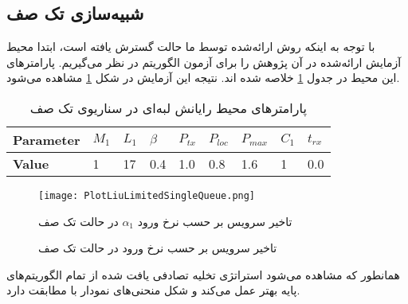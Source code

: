 \subsection{شبیه‌سازی تک صف}
با توجه به اینکه روش ارائه‌شده توسط ما حالت گسترش یافته \Cite{Liu} است، ابتدا محیط آزمایش ارائه‌شده در آن پژوهش را برای آزمون الگوریتم در نظر می‌گیریم. پارامترهای این محیط در جدول \ref{table:parameters-singlequeue} خلاصه شده اند. نتیجه این آزمایش در شکل \ref{plot:singleQueue} مشاهده می‌شود.

\begin{table}
	\centering
	\begin{latin}
		\begin{tabular}{@{}lllllllll@{}}
			\toprule
			\textbf{Parameter} & $M_1$ & $L_1$ & $\beta$ & $P_{tx}$ & $P_{loc}$ & $P_{max}$ & $C_1$ & $t_{rx}$ \\ \midrule
			\textbf{Value}             & 1    & 17   & 0.4  & 1.0 & 0.8  & 1.6  & 1    & 0.0   \\ \bottomrule
		\end{tabular}
	\end{latin}
	\caption{پارامترهای محیط رایانش لبه‌ای در سناریوی تک صف}
	\label{table:parameters-singlequeue}
\end{table}

\begin{figure}
	\centering
	\texttt{[image: PlotLiuLimitedSingleQueue.png]}
	\caption{تاخیر سرویس بر حسب نرخ ورود در حالت تک صف}{تاخیر سرویس بر حسب نرخ ورود $\alpha_1$ در حالت تک صف}
	\label{plot:singleQueue}
\end{figure}
همانطور که مشاهده می‌شود استراتژی تخلیه تصادفی یافت شده از تمام الگوریتم‌های پایه بهتر عمل می‌کند و شکل منحنی‌های نمودار با \Cite{Liu} مطابقت دارد.

